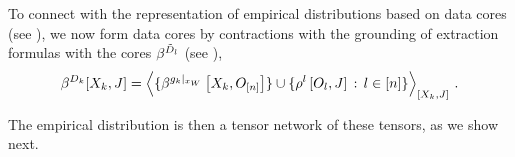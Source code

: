 To connect with the representation of empirical distributions based on data cores (see ), we now form data cores by contractions with the grounding of extraction formulas with the cores $\beta^{\tilde{D}_{l}}$ (see ),
\begin{align*}
    \datacoreofat{\atomenumerator}{\catvariableof{\catenumerator},\datvariable}
    = \contractionof{
        \{\bencodingofat{\groundingof{\extformulaof{\atomenumerator}}}{\catvariableof{\catenumerator},\shortindvariables}\}
        \cup \{ \legcoreofat{\indenumerator}{\indvariableof{\indenumerator},\datvariable} \wcols \indenumeratorin\}
    }{\catvariableof{\atomenumerator},\datvariable} \, .
\end{align*}

The empirical distribution is then a tensor network of these tensors, as we show next.

